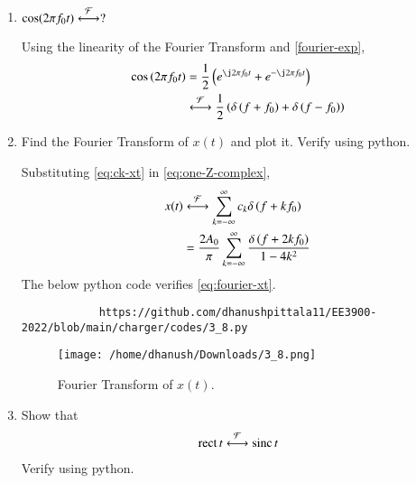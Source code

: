 \documentclass[journal,12pt,twocolumn]{IEEEtran}
\renewcommand\thesection{\arabic{section}}
\begin{document}
\begin{enumerate}[label=\thesection.\arabic*
		,ref=\thesection.\theenumi]
		\solution Suppose $g(t)\system{F}G(f)$. Then,
		\begin{align}
			g(t)e^{\j2\pi f_0t}&\system{F}\int_{-\infty}^{\infty}
			g(t)e^{-\j2\pi\brak{f-f_0}t}\, dt \\
			&=F(f-f_0)
			\label{eq:f-shift}
		\end{align}
		Using \eqref{eq:duality} in \eqref{eq:fourier-delta}, $1\system{F}\delta(-f)$.
		Hence, applying \eqref{eq:f-shift},
		\begin{align}
			e^{-\j2\pi f_0t}\system{F}\delta(-(f+f_0)) = \delta(f+f_0)
			\label{eq:fourier-exp}
		\end{align}
		\item $\cos(2\pi f_0t)\overset{\mathcal{F}}{ \longleftrightarrow}?$
		
		\solution Using the linearity of the Fourier 
		Transform and \eqref{fourier-exp},
		\begin{align}
			\cos\brak{2\pi f_0t} &= \frac{1}{2}
			\brak{e^{\j2\pi f_0t} + e^{-\j2\pi f_0t}} \\
			&\system{F}\frac{1}{2}\brak{\delta\brak{f+f_0} + \delta\brak{f-f_0}}
		\end{align}
		\item Find the Fourier Transform of $x(t)$ and plot it. Verify using python.
		
		\solution Substituting \eqref{eq:ck-xt} in \eqref{eq:one-Z-complex},
		\begin{align}
			x(t)&\overset{\mathcal{F}}{ \longleftrightarrow}\sum_{k=-\infty}^{\infty}c_k\delta\left(f+kf_0\right) \\
			&=\frac{2A_0}{\pi}\sum_{k=-\infty}^{\infty}\frac{\delta\left(f+2kf_0\right)}{1-4k^2}
			\label{eq:fourier-xt}
		\end{align}
		The below python code verifies \eqref{eq:fourier-xt}.
		\begin{lstlisting}
			https://github.com/dhanushpittala11/EE3900-2022/blob/main/charger/codes/3_8.py
		\end{lstlisting}
		\begin{figure}[!ht]
			\texttt{[image: /home/dhanush/Downloads/3\_8.png]}
			\caption{Fourier Transform of $x(t)$.}
			\label{eq:fig-fourier-xt}
		\end{figure}
		\item Show that
		\begin{align}
			\mathop{\mathrm{rect}}{t} \overset{\mathcal{F}}{ \longleftrightarrow} \mathop{\mathrm{sinc}}{t}
		\end{align}
		Verify using python.
		

\end{enumerate}
\end{document}
